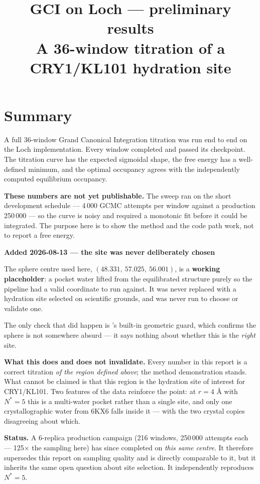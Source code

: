 \documentclass[11pt]{article}
\title{\vspace{-1.5em}GCI on Loch --- preliminary results\\[0.3em]
\large A 36-window titration of a CRY1/KL101 hydration site}
\author{}
\date{}
\newcommand{\file}[1]{\texttt{\detokenize{#1}}}
\newenvironment{caveat}[1]{%
  \begin{lrbox}{\gpbox}\begin{minipage}{0.94\linewidth}%
  \textbf{\textcolor{red!55!black}{#1}}\par\smallskip\small}%
 {\end{minipage}\end{lrbox}%
  \begin{center}\setlength{\fboxrule}{0.7pt}%
  \fcolorbox{red!55!black}{red!4}{\usebox{\gpbox}}\end{center}}
\begin{document}
\maketitle
\vspace{-2.5em}

\section*{Summary}

A full 36-window Grand Canonical Integration titration was run end to end on the Loch
implementation. Every window completed and passed its checkpoint. The titration curve has
the expected sigmoidal shape, the free energy has a well-defined minimum, and the optimal
occupancy agrees with the independently computed equilibrium occupancy.

\textbf{These numbers are not yet publishable.} The sweep ran on the short development
schedule --- 4\,000 GCMC attempts per window against a production 250\,000 --- so the curve
is noisy and required a monotonic fit before it could be integrated. The purpose here is to
show the method and the code path work, not to report a free energy.

\begin{caveat}{Added 2026-08-13 --- the site was never deliberately chosen}
The sphere centre used here, $(48.331,\ 57.025,\ 56.001)$, is a \textbf{working placeholder}:
a pocket water lifted from the equilibrated structure purely so the pipeline had a valid
coordinate to run against. It was never replaced with a hydration site selected on scientific
grounds, and \file{gci_map_centre.py} was never run to choose or validate one.

The only check that did happen is \file{gci_window.py}'s built-in geometric guard, which
confirms the sphere is not somewhere absurd --- it says nothing about whether this is the
\emph{right} site.

\textbf{What this does and does not invalidate.} Every number in this report is a correct
titration \emph{of the region defined above}; the method demonstration stands. What cannot be
claimed is that this region is the hydration site of interest for CRY1/KL101. Two features of
the data reinforce the point: at $r = 4$ \AA{} with $N^{*} = 5$ this is a multi-water pocket
rather than a single site, and only one crystallographic water from 6KX6 falls inside it ---
with the two crystal copies disagreeing about which.

\textbf{Status.} A 6-replica production campaign (216 windows, 250\,000 attempts each ---
125$\times$ the sampling here) has since completed on \emph{this same centre}. It therefore
supersedes this report on sampling quality and is directly comparable to it, but it inherits
the same open question about site selection. It independently reproduces $N^{*} = 5$.
\end{caveat}
\end{document}
